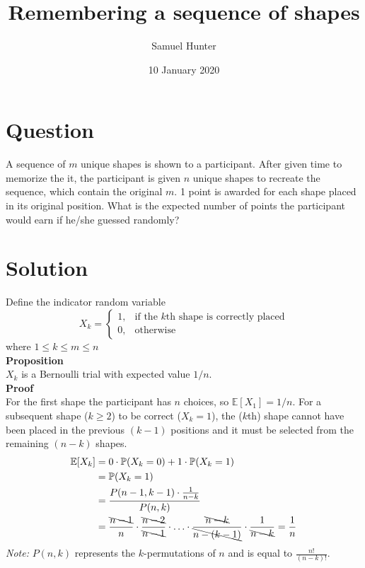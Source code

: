 \documentclass[a4paper,12pt]{article}
\newcommand*{\Perm}[2]{P(#1, #2)}
\begin{document}
\title{Remembering a sequence of shapes}
\author{Samuel Hunter}
\date{10 January 2020}
\maketitle

\section*{Question}
A sequence of $m$ unique shapes is shown to a participant. After given time to memorize the it, the participant is given $n$ unique shapes to recreate the sequence, which contain the original $m$. 1 point is awarded for each shape placed in its original position. What is the expected number of points the participant would earn if he/she guessed randomly?

\section*{Solution}
Define the indicator random variable
\begin{equation}
	X_k=
	\begin{cases}
		1, & \text{if the $k$th shape is correctly placed} \\
		0, & \text{otherwise}
	\end{cases}
\end{equation}
where $1 \leq k \leq m \leq n$\\

\noindent \textbf{Proposition}\\$X_k$ is a Bernoulli trial with expected value $1/n$.\\

\noindent \textbf{Proof}\\
For the first shape the participant has $n$ choices, so $\mathbb{E}[X_1] = 1/n$.
For a subsequent shape ($k \geq 2$) to be correct ($X_k = 1$), the ($k$th) shape cannot have been placed in the previous $(k-1)$ positions and it must be selected from the remaining $(n-k)$ shapes.\\
\begin{align}
	\mathbb{E}[X_k] &= 0 \cdot \mathbb{P}(X_k = 0) + 1 \cdot \mathbb{P}(X_k = 1)\\
	&= \mathbb{P}(X_k = 1)\\
	&= \frac{\Perm{n-1}{k-1} \cdot \frac{1}{n-k}}{\Perm{n}{k}}\\
	&= \frac{\bcancel{n-1}}{n} \cdot \frac{\bcancel{n-2}}{\bcancel{n-1}} \cdot \ldots \cdot \frac{\bcancel{n-k}}{\bcancel{n-(k-1)}} \cdot \frac{1}{\bcancel{n-k}} = \frac{1}{n}
\end{align}
\emph{Note:} $\Perm{n}{k}$ represents the $k$-permutations of $n$ and is equal to $\frac{n!}{(n-k)!}$.\\
\end{document}
